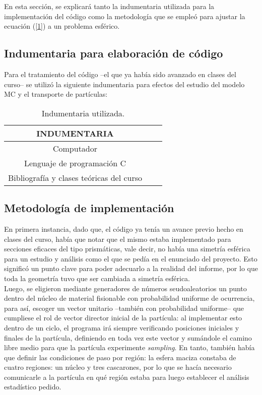 
En esta sección, se explicará tanto la indumentaria utilizada para la implementación del código como la metodología que se empleó para ajustar la ecuación (\ref{1}) a un problema esférico. 

\subsection{Indumentaria para elaboración de código}
Para el tratamiento del código --el que ya había sido avanzado en clases del curso-- se utilizó la siguiente indumentaria para efectos del estudio del modelo MC y el transporte de partículas:

\begin{table}
	\centering
	\begin{tabular}{|c|c|c|}
		\hline 
		 INDUMENTARIA \\
		\hline
		Computador \\ \hline
		Lenguaje de programación C \\ \hline
		Bibliografía y clases teóricas del curso \\
		\hline 
	\end{tabular} 
	\caption{Indumentaria utilizada.}
\end{table} 

\subsection{Metodología de implementación}
En primera instancia, dado que, el código ya tenía un avance previo hecho en clases del curso, había que notar que el mismo estaba implementado para secciones eficaces del tipo prismáticas, vale decir, no había una simetría esférica para un estudio y análisis como el que se pedía en el enunciado del proyecto. Esto significó un punto clave para poder adecuarlo a la realidad del informe, por lo que toda la geometría tuvo que ser cambiada a simetría esférica. \\

Luego, se eligieron mediante generadores de números seudoaleatorios un punto dentro del núcleo de material fisionable con probabilidad uniforme de ocurrencia, para así, escoger un vector unitario --también con probabilidad uniforme-- que cumpliese el rol de vector director inicial de la partícula: al implementar esto dentro de un ciclo, el programa irá siempre verificando posiciones iniciales y finales de la partícula, definiendo en toda vez este vector y sumándole el camino libre medio para que la partícula experimente \emph{sampling}. En tanto, también había que definir las condiciones de paso por región: la esfera maciza constaba de cuatro regiones: un núcleo y tres cascarones, por lo que se hacía necesario comunicarle a la partícula en qué región estaba para luego establecer el análisis estadístico pedido. \\

